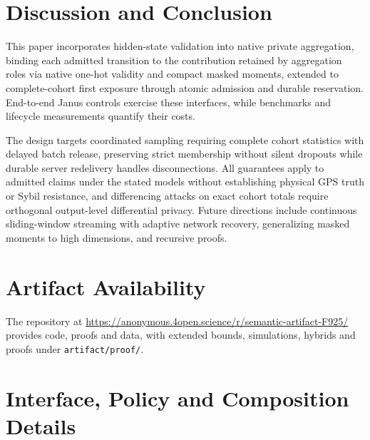 \documentclass[conference,compsoc]{IEEEtran}
\theoremstyle{definition}
\numberwithin{equation}{section}
\numberwithin{table}{section}
\numberwithin{figure}{section}
\theoremstyle{plain}
\begin{document}
\section{Discussion and Conclusion}
\label{sec:limitations}
\label{sec:conclusion}
This paper incorporates hidden-state validation into native private aggregation, binding each admitted transition to the contribution retained by aggregation roles via native one-hot validity and compact masked moments, extended to complete-cohort first exposure through atomic admission and durable reservation. End-to-end Janus controls exercise these interfaces, while benchmarks and lifecycle measurements quantify their costs.

The design targets coordinated sampling requiring complete cohort statistics with delayed batch release, preserving strict membership without silent dropouts while durable server redelivery handles disconnections. All guarantees apply to admitted claims under the stated models without establishing physical GPS truth or Sybil resistance, and differencing attacks on exact cohort totals require orthogonal output-level differential privacy. Future directions include continuous sliding-window streaming with adaptive network recovery, generalizing masked moments to high dimensions, and recursive proofs.

\section{Artifact Availability}
\label{sec:artifact}
The repository at \url{https://anonymous.4open.science/r/semantic-artifact-F925/} provides code, proofs and data,\label{sec:artifact-proofs} with extended bounds, simulations, hybrids and proofs under \nolinkurl{artifact/proof/}.

\FloatBarrier
\clearpage
\label{boundary:references}
{\footnotesize
\printbibliography}
\clearpage
\appendices
\renewcommand{\thetheorem}{\Alph{section}.\arabic{theorem}}
\renewcommand{\theHtheorem}{\Alph{section}.\arabic{theorem}}
\renewcommand{\thelemma}{\Alph{section}.\arabic{lemma}}
\renewcommand{\theHlemma}{\Alph{section}.\arabic{lemma}}
\renewcommand{\theproposition}{\Alph{section}.\arabic{proposition}}
\renewcommand{\theHproposition}{\Alph{section}.\arabic{proposition}}
\renewcommand{\thedefinition}{\Alph{section}.\arabic{definition}}
\renewcommand{\theHdefinition}{\Alph{section}.\arabic{definition}}
\setcounter{theorem}{0}
\setcounter{lemma}{0}
\setcounter{proposition}{0}
\setcounter{definition}{0}
\section{Interface, Policy and Composition Details}
\label{boundary:appendix}
\label{sec:composition-failures}
\end{document}
